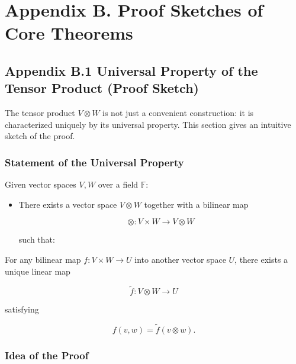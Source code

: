 \documentclass[
  letterpaper,
  DIV=11,
  numbers=noendperiod]{scrreprt}
\begin{document}
\section{Appendix B. Proof Sketches of Core
Theorems}\label{appendix-b.-proof-sketches-of-core-theorems}

\subsection{Appendix B.1 Universal Property of the Tensor Product (Proof
Sketch)}\label{appendix-b.1-universal-property-of-the-tensor-product-proof-sketch}

The tensor product \(V \otimes W\) is not just a convenient
construction: it is characterized uniquely by its universal property.
This section gives an intuitive sketch of the proof.

\subsubsection{Statement of the Universal
Property}\label{statement-of-the-universal-property}

Given vector spaces \(V, W\) over a field \(\mathbb{F}\):

\begin{itemize}
\item
  There exists a vector space \(V \otimes W\) together with a bilinear
  map

  \[
  \otimes : V \times W \to V \otimes W
  \]

  such that:
\end{itemize}

For any bilinear map \(f : V \times W \to U\) into another vector space
\(U\), there exists a unique linear map

\[
\tilde{f}: V \otimes W \to U
\]

satisfying

\[
f(v,w) = \tilde{f}(v \otimes w).
\]

\subsubsection{Idea of the Proof}\label{idea-of-the-proof}
\end{document}
